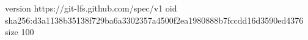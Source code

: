 version https://git-lfs.github.com/spec/v1
oid sha256:d3a1138b35138f729ba6a3302357a4500f2ea1980888b7fccdd16d3590ed4376
size 100
